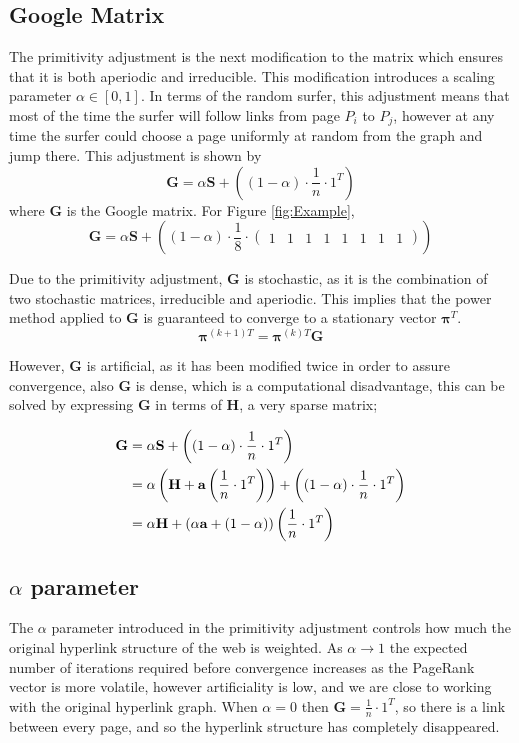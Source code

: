 \documentclass[11pt]{report}
\begin{document}
\subsection{Google Matrix}\label{sec:google}
The primitivity adjustment is the next modification to the matrix which ensures that it is both aperiodic and irreducible. This modification introduces a scaling parameter $\alpha \in [0,1]$. In terms of the random surfer, this adjustment means that most of the time the surfer will follow links from page $P_i$ to $P_j$, however at any time the surfer could choose a page uniformly at random from the graph and jump there. This adjustment is shown by 
\begin{equation}\label{eq:G}
\textbf{G}=\alpha\textbf{S}+\left((1-\alpha)\cdot\frac{1}{n}\cdot1^T\right)
\end{equation} 
where \textbf{G} is the Google matrix. For Figure \ref{fig:Example},
\[\textbf{G}=\alpha\textbf{S}+\left((1-\alpha)\cdot \frac{1}{8} \cdot \left(  \begin{array}{cccccccc}
1&1&1&1&1&1&1&1\end{array}\right) \right)\]

Due to the primitivity adjustment, \textbf{G} is stochastic, as it is the combination of two stochastic matrices, irreducible and aperiodic. This implies that the power method applied to \textbf{G} is guaranteed to converge to a stationary vector $\boldsymbol{\pi}^T$.
\begin{equation}\label{eq:power to G}
\boldsymbol{\pi}^{(k+1)T} = \boldsymbol{\pi}^{(k)T}\textbf{G}
\end{equation} 

However, \textbf{G} is artificial, as it has been modified twice in order to assure convergence, also \textbf{G} is dense, which is a computational disadvantage, this can be solved by expressing \textbf{G} in terms of \textbf{H}, a very sparse matrix; 
 
\begin{align}
\textbf{G} & = \alpha\textbf{S}+\left((1-\alpha)\cdot\frac{1}{n}\cdot1^T\right)\notag\\
& = \alpha \left(\textbf{H} + \textbf{a}\left(\frac{1}{n}\cdot 1^{T}\right)\right) + \left((1-\alpha)\cdot\frac{1}{n}\cdot1^T\right)\notag\\
& = \alpha\textbf{H} + (\alpha\textbf{a} +(1-\alpha))\left(\frac{1}{n}\cdot 1^T\right)\label{eq:G in H}
\end{align} 

\subsection{$\alpha$ parameter} \label{sec:alpha}
The $\alpha$ parameter introduced in the primitivity adjustment controls how much the original hyperlink structure of the web is weighted. As $\alpha \rightarrow 1$ the expected number of iterations required before convergence increases as the PageRank vector is more volatile, however artificiality is low, and we are close to working with the original hyperlink graph. When $\alpha =0$ then $\textbf{G}=\frac{1}{n}\cdot 1^T$, so there is a link between every page, and so the hyperlink structure has completely disappeared. 
\end{document}

